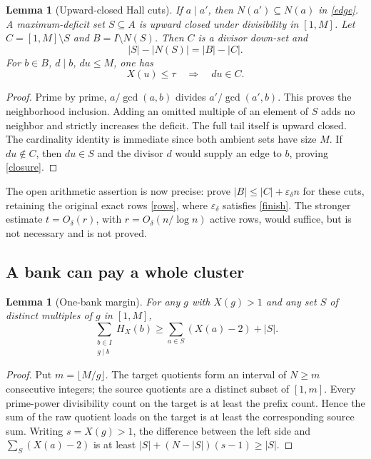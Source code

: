 \documentclass[11pt,a4paper]{article}
\newtheorem{lemma}[theorem]{Lemma}
\begin{document}
\begin{lemma}[Upward-closed Hall cuts]
If $a\mid a'$, then $N(a')\subseteq N(a)$ in \eqref{edge}. A maximum-deficit
set $S\subseteq A$ is upward closed under divisibility in $[1,M]$.
Let $C=[1,M]\setminus S$ and $B=I\setminus N(S)$. Then $C$ is a divisor
down-set and
\begin{equation}
 |S|-|N(S)|=|B|-|C|.                                    \label{cut}
\end{equation}
For $b\in B$, $d\mid b$, $du\le M$, one has
\begin{equation}
 X(u)\le\tau\quad\Longrightarrow\quad du\in C.           \label{closure}
\end{equation}
\end{lemma}
\begin{proof}
Prime by prime, $a/\gcd(a,b)$ divides $a'/\gcd(a',b)$. This proves the
neighborhood inclusion. Adding an omitted multiple of an element of $S$
adds no neighbor and strictly increases the deficit. The full tail itself
is upward closed. The cardinality identity is immediate since both ambient
sets have size $M$. If $du\notin C$, then $du\in S$ and the divisor $d$
would supply an edge to $b$, proving \eqref{closure}.
\end{proof}

The open arithmetic assertion is now precise: prove
$|B|\le|C|+\varepsilon_\delta n$ for these cuts, retaining the original exact
rows \eqref{rows}, where $\varepsilon_\delta$ satisfies \eqref{finish}.
The stronger estimate $t=O_\delta(r)$, with $r=O_\delta(n/\log n)$ active rows,
would suffice, but is not necessary and is not proved.

\subsection{A bank can pay a whole cluster}

\begin{lemma}[One-bank margin]
For any $g$ with $X(g)>1$ and any set $S$ of distinct multiples of $g$ in
$[1,M]$,
\begin{equation}
 \sum_{\substack{b\in I\\g\mid b}}H_X(b)
 \ge\sum_{a\in S}(X(a)-2)+|S|.                          \label{cluster}
\end{equation}
\end{lemma}
\begin{proof}
Put $m=\lfloor M/g\rfloor$. The target quotients form an interval of $N\ge m$
consecutive integers; the source quotients are a distinct subset of $[1,m]$.
Every prime-power divisibility count on the target is at least the prefix
count. Hence the sum of the raw quotient loads on the target is at least
the corresponding source sum. Writing $s=X(g)>1$, the difference between
the left side and $\sum_S(X(a)-2)$ is at least
$|S|+(N-|S|)(s-1)\ge|S|$.
\end{proof}
\end{document}
